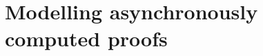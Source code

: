 \documentclass[runningheads,a4paper,oribibl]{llncs}
\newcommand{\tmverbatim}[1]{\lstinline|#1|}
\begin{document}
%   
% 

\section{Modelling asynchronously computed proofs}\label{futures}
\end{document}
